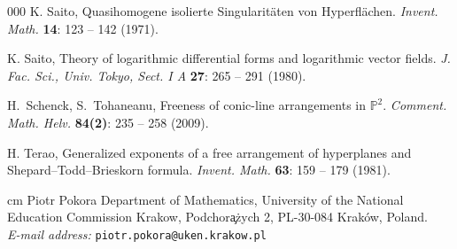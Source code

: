 \documentclass[12pt]{article}
\theoremstyle{plain}
\theoremstyle{definition}
\begin{document}
\begin{thebibliography}{000}
K. Saito, Quasihomogene isolierte Singularit\"aten von Hyperfl\"achen. \textit{Invent. Math.} \textbf{14}: 123 -- 142 (1971).

K. Saito, Theory of logarithmic differential forms and logarithmic vector fields. \textit{J. Fac. Sci., Univ. Tokyo, Sect. I A} \textbf{27}: 265 -- 291 (1980).

  H.~Schenck, S.~Tohaneanu, Freeness of conic-line arrangements in $\mathbb{P}^2$. 
\textit{Comment. Math. Helv.} {\bf 84(2)}: 235 -- 258 (2009).
 
H. Terao, Generalized exponents of a free arrangement of hyperplanes and Shepard–Todd–Brieskorn formula. \textit{Invent. Math.} \textbf{63}: 159 -- 179 (1981).
\end{thebibliography}


 cm
\bigskip
Piotr Pokora
Department of Mathematics,
University of the National Education Commission Krakow,
Podchor\c a\.zych 2,
PL-30-084 Krak\'ow, Poland. \\
\nopagebreak
\textit{E-mail address:} \texttt{piotr.pokora@uken.krakow.pl}
\end{document}

